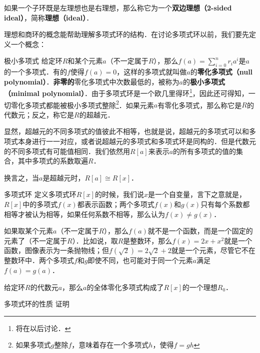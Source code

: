 如果一个子环既是左理想也是右理想，那么称它为一个\textbf{双边理想（2-sided ideal）}，简称\textbf{理想（ideal）}．

理想和商环的概念能帮助理解多项式环的结构．在讨论多项式环以前，我们要先定义一个概念：

\begin{definition}{极小多项式}
给定环$R$和某个元素$a$（不一定属于$R$），那么$f(a)=\sum\limits^{n}_{i=0}r_ia^i$是$a$的一个多项式．有的$f$使得$f(a)=0$，这样的多项式就叫做$a$的\textbf{零化多项式（null polynomial）}．\textbf{非零的}零化多项式中次数最低的，被称为$a$的\textbf{极小多项式（minimal polynomial）}．由于多项式环是一个欧几里得环\footnote{将在以后讨论．}，因此还可得知，一切零化多项式都能被极小多项式整除\footnote{如果多项式$g$整除$f$，意味着存在一个多项式$h$，使得$f=gh$}．如果元素$a$有零化多项式，那么称它是$R$的代数元；反之，称它是$R$的超越元．
\end{definition}

显然，超越元的不同多项式的值彼此不相等，也就是说，超越元的多项式可以和多项式本身进行一一对应，或者说超越元的多项式和多项式环是同构的．但是代数元的不同多项式有可能值相同．我们依然用$R[a]$来表示$a$的所有多项式的值的集合，其中多项式的系数取遍$R$．

换言之，当$a$是超越元时，$R[a]\cong R[x]$．

\begin{example}{多项式环}
定义多项式环$R[x]$的时候，我们说$x$是一个自变量，言下之意就是，$R[x]$中的多项式$f(x)$都表示函数；两个多项式$f(x)$和$g(x)$只有每个系数都相等才被认为相等，如果任何系数不相等，那么认为$f(x)\not=g(x)$．

如果取某个元素$a$（不一定属于$R$），那么$f(a)$就不是一个函数，而是一个固定的元素了（不一定属于$R$）．比如说，取$R$是整数环，那么$f(x)=2x+x^2$就是一个函数，图像表示为一条抛物线；但$f(\sqrt{2})=2\sqrt{2}+2$就是一个元素，尽管它不在整数环中．两个多项式$f$和$g$即使不同，也可能对于同一个元素$a$满足$f(a)=g(a)$．

给定环$R$的代数元$a$，那么$a$的全体零化多项式构成了$R[x]$的一个理想$R_0$．


\end{example}

\begin{exercise}{多项式环的性质}
证明$$
\end{exercise}
